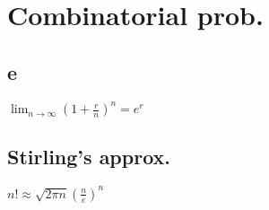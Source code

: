\section{Combinatorial prob.}

	\subsection*{e}
	$\lim_{n\to\infty}\left(1 + \frac{r}{n}\right)^{n} = e^{r}$

	\subsection*{Stirling's approx.}
	$n!\approx\sqrt{2\pi n}\left(\frac{n}{e}\right)^{n}$
	